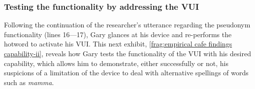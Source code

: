 \subsubsection{Testing the functionality by addressing the VUI}\label{sec:empirical cafe findings capability testing}
\begin{revisedsubmission}
Following the continuation of the researcher's utterance regarding the pseudonym functionality (lines 16---17), Gary glances at his device and re-performs the hotword to activate his \ac{VUI}.
This next exhibit, \autoref{frag:empirical cafe findings capability-ii}, reveals how Gary tests the functionality of the \ac{VUI} with his desired capability, which allows him to demonstrate, either successfully or not, his suspicions of a limitation of the device to deal with alternative spellings of words such as \textit{mamma}.


\end{revisedsubmission}
